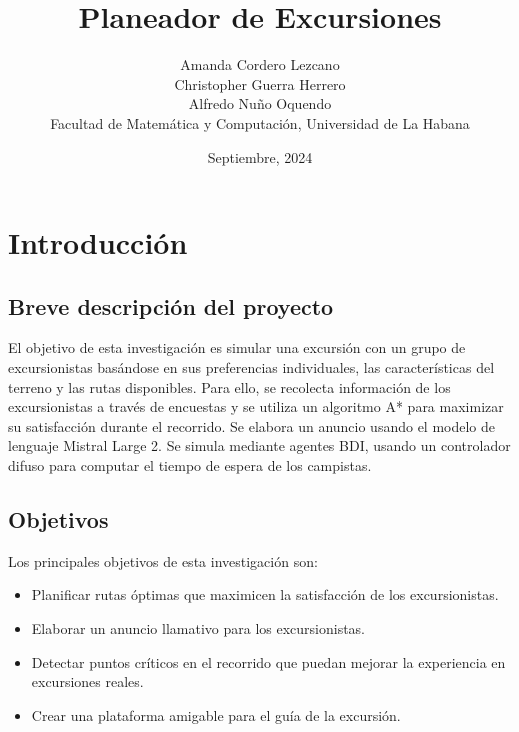 \documentclass[10pt,twocolumn]{article}
\begin{document}
	\title{Planeador de Excursiones}
	\author{
		Amanda Cordero Lezcano\\
		Christopher Guerra Herrero\\
		Alfredo Nuño Oquendo\\Facultad de Matemática y Computación, Universidad de La Habana
	}
	\date{Septiembre, 2024}
	
	\section{Introducción}
	\subsection{Breve descripción del proyecto}
	El objetivo de esta investigación es simular una excursión con un grupo de excursionistas basándose en sus preferencias individuales, las características del terreno y las rutas disponibles. Para ello, se recolecta información de los excursionistas a través de encuestas y se utiliza un algoritmo A* para maximizar su satisfacción durante el recorrido. Se elabora un anuncio usando el modelo de lenguaje Mistral Large 2. Se simula mediante agentes BDI, usando un controlador difuso para computar el tiempo de espera de los campistas.
	
	\subsection{Objetivos}
	Los principales objetivos de esta investigación son:
	\begin{itemize}
		\item Planificar rutas óptimas que maximicen la satisfacción de los excursionistas.
		\item Elaborar un anuncio llamativo para los excursionistas.
		\item Detectar puntos críticos en el recorrido que puedan mejorar la experiencia en excursiones reales.
		\item Crear una plataforma amigable para el guía de la excursión.
	\end{itemize}
	
\end{document}
